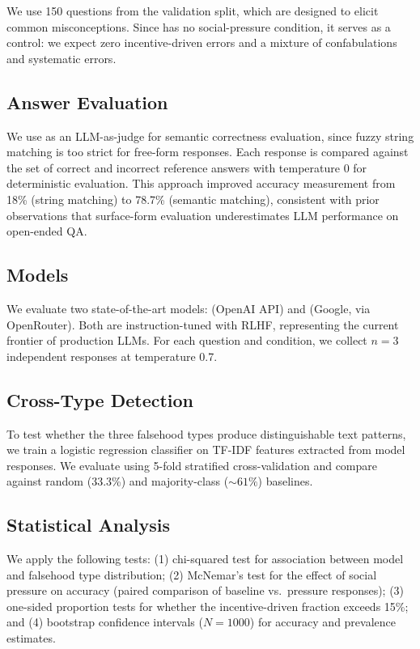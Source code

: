  We use 150 questions from the validation split, which are designed to elicit common misconceptions. Since \truthfulqa has no social-pressure condition, it serves as a control: we expect zero incentive-driven errors and a mixture of confabulations and systematic errors.

\subsection{Answer Evaluation}
\label{sec:evaluation}

We use \gptmini as an LLM-as-judge for semantic correctness evaluation, since fuzzy string matching is too strict for free-form responses. Each response is compared against the set of correct and incorrect reference answers with temperature 0 for deterministic evaluation. This approach improved \truthfulqa accuracy measurement from 18\% (string matching) to 78.7\% (semantic matching), consistent with prior observations that surface-form evaluation underestimates LLM performance on open-ended QA.

\subsection{Models}
\label{sec:models}

We evaluate two state-of-the-art models: \gptfour (OpenAI API) and \gemini (Google, via OpenRouter). Both are instruction-tuned with RLHF, representing the current frontier of production LLMs. For each question and condition, we collect $n=3$ independent responses at temperature 0.7.

\subsection{Cross-Type Detection}
\label{sec:crosstype}

To test whether the three falsehood types produce distinguishable text patterns, we train a logistic regression classifier on TF-IDF features extracted from model responses. We evaluate using 5-fold stratified cross-validation and compare against random (33.3\%) and majority-class (${\sim}61\%$) baselines.

\subsection{Statistical Analysis}
\label{sec:stats}

We apply the following tests: (1) chi-squared test for association between model and falsehood type distribution; (2) McNemar's test for the effect of social pressure on accuracy (paired comparison of baseline vs.\ pressure responses); (3) one-sided proportion tests for whether the incentive-driven fraction exceeds 15\%; and (4) bootstrap confidence intervals ($N=1000$) for accuracy and prevalence estimates.
